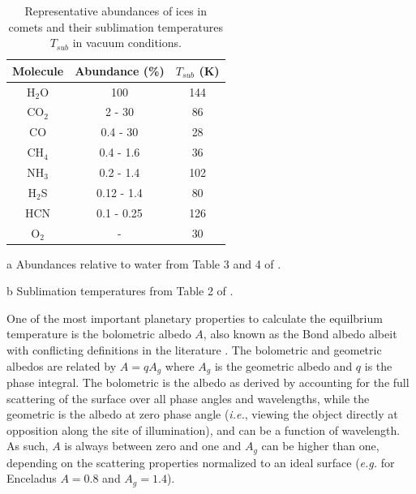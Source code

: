 \documentclass[a4paper,fleqn,usenatbib]{mnras}
\begin{document}

\begin{table}
\centering
\begin{threeparttable}
\centering
\caption{Representative abundances of ices in comets and their sublimation temperatures $T_{sub}$ in vacuum conditions.}
\begin{tabular}{ c c c }
 \hline
 \hline
	Molecule & Abundance (\%)\tnote{a} & $T_{sub}$ (K)\tnote{b} \\
 \hline
	H$_2$O & 100 & 144 \\
	CO$_2$ & 2 - 30 & 86 \\
	CO & 0.4 - 30 & 28 \\
	CH$_4$ & 0.4 - 1.6 & 36 \\
	NH$_3$ & 0.2 - 1.4 & 102 \\
	H$_2$S & 0.12 - 1.4 & 80 \\
	HCN & 0.1 - 0.25 & 126 \\
	O$_2$ & - & 30 \\
 \hline
 \hline
\end{tabular}
\label{tab:ices}
	\begin{tablenotes}
	\small
\item[a]{Abundances relative to water from Table 3 and 4 of \citet{2011ARA&A..49..471M}.}
\item[b]{Sublimation temperatures from Table 2 of \citet{2017MNRAS.469S.108G}.}
	\end{tablenotes}
\end{threeparttable}
\end{table}


One of the most important planetary properties to calculate the equilbrium temperature is the bolometric albedo $A$, also known as the Bond albedo albeit with conflicting definitions in the literature \citep{1916PNAS....2...74R, 1981A&A...104...42H, 1999PCEC...24..573G,2016AJ....152..209M}. The bolometric and geometric albedos are related by $A = qA_g$ where $A_g$ is the geometric albedo and $q$ is the phase integral. The bolometric is the albedo as derived by accounting for the full scattering of the surface over all phase angles and wavelengths, while the geometric is the albedo at zero phase angle (\emph{i.e.}, viewing the object directly at opposition along the site of illumination), and can be a function of wavelength. As such, $A$ is always between zero and one and $A_g$ can be higher than one, depending on the scattering properties normalized to an ideal surface (\emph{e.g.} for Enceladus $A=0.8$ and $A_g=1.4$).
\end{document}
